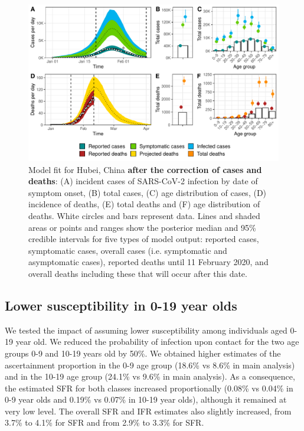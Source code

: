 \documentclass{article}
\begin{document}
\begin{figure}[H]
	\includegraphics[width=\linewidth]{../format_output/figures_v3/supp_fit_16B.pdf}
	\caption{Model fit for Hubei, China \textbf{after the correction of cases and deaths}: (A) incident cases of SARS-CoV-2 infection by date of symptom onset, (B) total cases, (C) age distribution of cases, (D) incidence of deaths, (E) total deaths and (F) age distribution of deaths. White circles and bars represent data. Lines and shaded areas or points and ranges show the posterior median and 95\% credible intervals for five types of model output: reported cases, symptomatic cases, overall cases (i.e. symptomatic and asymptomatic cases), reported deaths until 11 February 2020, and overall deaths including these that will occur after this date.}\label{fig:sens_cor}
\end{figure}

\clearpage
\subsection{Lower susceptibility in 0-19 year olds}
We tested the impact of assuming lower susceptibility among individuals aged 0-19 year old. We reduced the probability of infection upon contact for the two age groups 0-9 and 10-19 years old by 50\%. We obtained higher estimates of the ascertainment proportion in the 0-9 age group (18.6\% vs 8.6\% in main analysis) and in the 10-19 age group (24.1\% vs 9.6\% in main analysis). As a consequence, the estimated SFR for both classes increased proportionally (0.08\% vs 0.04\% in 0-9 year olds and 0.19\% vs 0.07\% in 10-19 year olds), although it remained at very low level. The overall SFR and IFR estimates also slightly increased, from 3.7\% to 4.1\% for SFR and from 2.9\% to 3.3\% for SFR.
\end{document}
